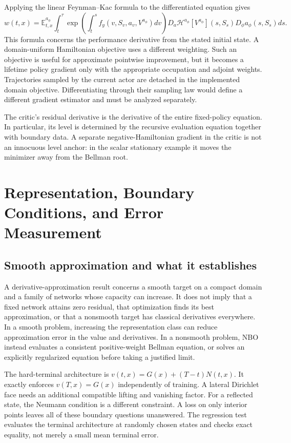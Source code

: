 \documentclass[ecta,draft]{econsocart}
\newcommand{\E}{\mathbb E}
\newcommand{\HH}{\mathcal H}
\begin{document}
Applying the linear Feynman--Kac formula to the differentiated equation gives
\[
 w(t,x)=\E_{t,x}^{a_\phi}\int_t^\tau
 \exp\left(\int_t^s f_y(v,S_v,a_v,V^{a_\phi})dv\right)
 D_a\HH^{a_\phi}[V^{a_\phi}](s,S_s)D_\phi a_\phi(s,S_s)ds.
\]
This formula concerns the performance derivative from the stated initial state. A domain-uniform Hamiltonian objective uses a different weighting. Such an objective is useful for approximate pointwise improvement, but it becomes a lifetime policy gradient only with the appropriate occupation and adjoint weights. Trajectories sampled by the current actor are detached in the implemented domain objective. Differentiating through their sampling law would define a different gradient estimator and must be analyzed separately.

The critic's residual derivative is the derivative of the entire fixed-policy equation. In particular, its level is determined by the recursive evaluation equation together with boundary data. A separate negative-Hamiltonian gradient in the critic is not an innocuous level anchor: in the scalar stationary example it moves the minimizer away from the Bellman root.

\section{Representation, Boundary Conditions, and Error Measurement}
\subsection{Smooth approximation and what it establishes}
A derivative-approximation result concerns a smooth target on a compact domain and a family of networks whose capacity can increase. It does not imply that a fixed network attains zero residual, that optimization finds its best approximation, or that a nonsmooth target has classical derivatives everywhere. In a smooth problem, increasing the representation class can reduce approximation error in the value and derivatives. In a nonsmooth problem, NBO instead evaluates a consistent positive-weight Bellman equation, or solves an explicitly regularized equation before taking a justified limit.

The hard-terminal architecture is $v(t,x)=G(x)+(T-t)N(t,x)$. It exactly enforces $v(T,x)=G(x)$ independently of training. A lateral Dirichlet face needs an additional compatible lifting and vanishing factor. For a reflected state, the Neumann condition is a different constraint. A loss on only interior points leaves all of these boundary questions unanswered. The regression test evaluates the terminal architecture at randomly chosen states and checks exact equality, not merely a small mean terminal error.
\end{document}
